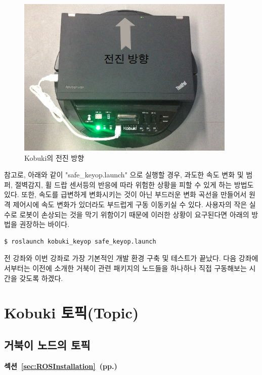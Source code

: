 \begin{figure}[h]
\centering\includegraphics[width=0.7\columnwidth]{pictures/chapter10/kobuki_test.png}
\caption{Kobuki의 전진 방향}
\end{figure}

\vspace{\baselineskip}
\noindent
참고로, 아래와 같이 "safe\_keyop.launch" 으로 실행할 경우, 과도한 속도 변화 및 범퍼, 절벽감지, 휠 드랍 센서등의 반응에 따라 위험한 상황을 피할 수 있게 하는 방법도 있다. 또한, 속도를 급변하게 변화시키는 것이 아닌 부드러운 변화 곡선을 만들어서 원격 제어시에 속도 변화가 있더라도 부드럽게 구동 이동키실 수 있다. 사용자의 작은 실수로 로봇이 손상되는 것을 막기 위함이기 때문에 이러한 상황이 요구된다면 아래의 방법을 권장하는 바이다.

\begin{lstlisting}[language=ROS]
$ roslaunch kobuki_keyop safe_keyop.launch
\end{lstlisting}

전 강좌와 이번 강좌로 가장 기본적인 개발 환경 구축 및 테스트가 끝났다. 다음 강좌에서부터는 이전에 소개한 거북이 관련 패키지의 노드들을 하나하나 직접 구동해보는 시간을 갖도록 하겠다.

\section{Kobuki 토픽(Topic)}

\subsection{거북이 노드의 토픽}

\textbf{섹션~\ref{sec:ROSInstallation}~(pp.\pageref{sec:ROSInstallation})} 

